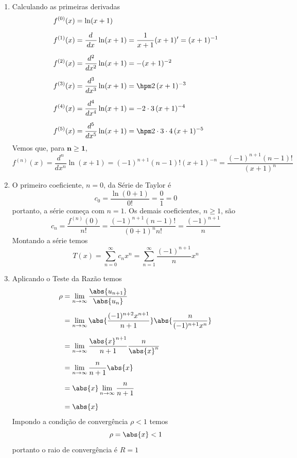 \documentclass[a4paper,12pt,fleqn]{article}
\begin{document}
\begin{answer}
  \begin{enumerate}[label=\alph*)]
    \item Calculando as primeiras derivadas
    \begin{align*}
      f^{(0)}(x) & = \ln(x+1) \\[2mm]
      f^{(1)}(x) & = \frac{\,d\;}{\,dx\;}\ln(x+1) = \frac{1}{x+1}(x+1)' = (x+1)^{-1} \\[2mm]
      f^{(2)}(x) & = \frac{d^2}{dx^2}    \ln(x+1) =    -                  (x+1)^{-2} \\[2mm]
      f^{(3)}(x) & = \frac{d^3}{dx^3}    \ln(x+1) = \hpm 2              \,(x+1)^{-3} \\[2mm]
      f^{(4)}(x) & = \frac{d^4}{dx^4}    \ln(x+1) =    - 2\cdot 3       \,(x+1)^{-4} \\[2mm]
      f^{(5)}(x) & = \frac{d^5}{dx^5}    \ln(x+1) = \hpm 2\cdot 3\cdot 4\,(x+1)^{-5}
    \end{align*}
    Vemos que, para $\bm{n\geq1}$,
    \[
      f^{(n)}(x)
      = \frac{d^n}{dx^n} \ln(x+1)
      = (-1)^{n+1} (n-1)! (x+1)^{-n}
      = \frac{(-1)^{n+1} (n-1)!}{(x+1)^n}
    \]
    \item O primeiro coeficiente, $n=0$, da Série de Taylor é
      \[
        c_0 = \frac{\ln(0+1)}{0!} = \frac{0}{1} = 0
      \]
      portanto, a série começa com $n=1$.
      Os demais coeficientes, $n\geq 1$, são
      \[
        c_n
        = \frac{f^{(n)}(0)}{n!}
        = \frac{(-1)^{n+1} (n-1)!}{(0+1)^nn!}
        = \frac{(-1)^{n+1}}{n}
      \]
      Montando a série temos
      \[
        T(x)
        = \sum_{n=0}^\infty c_n x^n
        = \sum_{n=1}^\infty \frac{(-1)^{n+1}}{n} x^n
      \]
      \item Aplicando o Teste da Razão temos
      \begin{align*}
        \rho
        & = \lim_{n\to\infty} \frac{\abs{u_{n+1}}}{\abs{u_n}} \\[2mm]
        & = \lim_{n\to\infty} \abs{\frac{(-1)^{n+2} x^{n+1}}{n+1}} \abs{\frac{n}{(-1)^{n+1} x^n}} \\[2mm]
        & = \lim_{n\to\infty} \frac{\abs{x}^{n+1}}{n+1} \frac{n}{\abs{x}^n} \\[2mm]
        & = \lim_{n\to\infty} \frac{n}{n+1} \abs{x}\\[2mm]
        & = \abs{x} \lim_{n\to\infty} \frac{n}{n+1}\\[2mm]
        & = \abs{x}
      \end{align*}
      Impondo a condição de convergência $\rho<1$ temos
      \[
        \rho = \abs{x} < 1
      \]
      portanto o raio de convergência é $R=1$


  \end{enumerate}
\end{answer}
\end{document}

